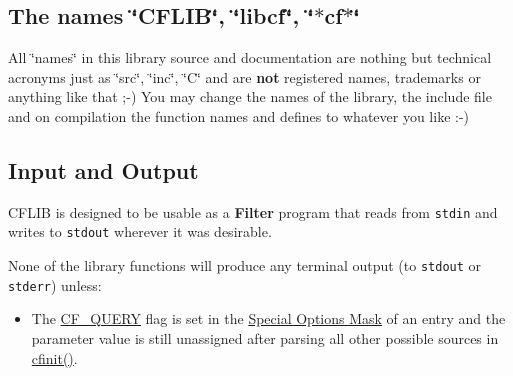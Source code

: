 \hypertarget{properties_names}{}\subsection{The names \char`\"{}CFLIB\char`\"{}, \char`\"{}libcf\char`\"{}, \char`\"{}$\ast$cf$\ast$\char`\"{}}\label{properties_names}
All \char`\"{}names\char`\"{} in this library source and documentation are nothing but technical acronyms just as \char`\"{}src\char`\"{}, \char`\"{}inc\char`\"{}, \char`\"{}C\char`\"{} and are {\bf not} registered names, trademarks or anything like that ;-) You may change the names of the library, the include file and on compilation the function names and defines to whatever you like :-)\hypertarget{properties_io}{}\subsection{Input and Output}\label{properties_io}
CFLIB is designed to be usable as a {\bf Filter} program that reads from {\tt stdin} and writes to {\tt stdout} wherever it was desirable.

None of the library functions will produce any terminal output (to {\tt stdout} or {\tt stderr}) unless:

\begin{itemize}
\item The \hyperlink{group__special__options__mask_ge39e0d9b4e9af8c6d4b3676783dd26e0}{CF\_\-QUERY} flag is set in the \hyperlink{group__special__options__mask}{Special Options Mask} of an entry and the parameter value is still unassigned after parsing all other possible sources in \hyperlink{group__cflib__core_ge593ff607f853bd5fc16a16bb6759314}{cfinit()}.\end{itemize}


